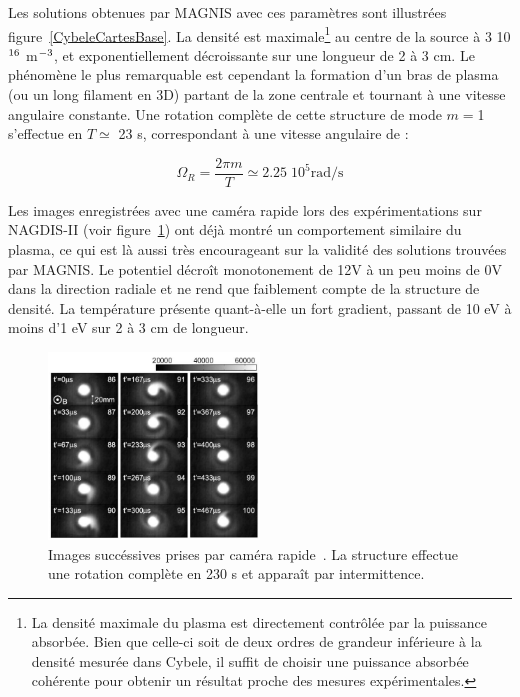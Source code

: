 \begin{refsection}
Les solutions obtenues par MAGNIS avec ces paramètres sont illustrées
figure~\ref{CybeleCartesBase}. La densité est maximale\footnote{La
densité maximale du plasma est directement contrôlée par la puissance
absorbée. Bien que celle-ci soit de deux ordres de grandeur inférieure à la
densité mesurée dans Cybele, il suffit de choisir une puissance absorbée
cohérente pour obtenir un résultat proche des mesures expérimentales.} au centre
de la source à 3 10$^{{16}}$ m$^{{-3}}$, et
exponentiellement décroissante sur une longueur de 2 à 3 cm. Le phénomène le plus
remarquable est cependant la formation d'un bras de plasma (ou un long filament
en 3D) partant de la zone centrale et tournant à une vitesse angulaire
constante.
Une rotation complète de cette structure de mode $m=$1 s'effectue en $T\simeq$
23 \micro s, correspondant à une vitesse angulaire de :

\begin{equation}
\Omega_R=\frac{2\pi m}{T}\simeq2.25\;10^5\text{rad/s}
\end{equation}

Les images enregistrées avec une caméra rapide lors des expérimentations
sur NAGDIS-II (voir figure~\ref{4-CybeleNagdis}) ont déjà montré un comportement
similaire du plasma, ce qui est là aussi très
encourageant sur la validité des solutions trouvées par MAGNIS. Le potentiel
décroît monotonement de 12V à un peu moins de 0V dans la direction radiale et
ne rend que faiblement compte de la structure de densité.
 La température présente quant-à-elle un fort gradient, passant de 10 eV à moins
 d'1 eV sur 2 à 3 cm de longueur.

\begin{figure}[htbp]
\centering
\includegraphics[width=0.5\textwidth]{figures/4-CybeleNAGDIS.png}
\caption{Images succéssives prises par caméra rapide~\parencite{NagdisCamera}.
La structure effectue une rotation complète en 230 \micro s et apparaît par
intermittence.
\label{4-CybeleNagdis}}
\end{figure}


\end{refsection}
